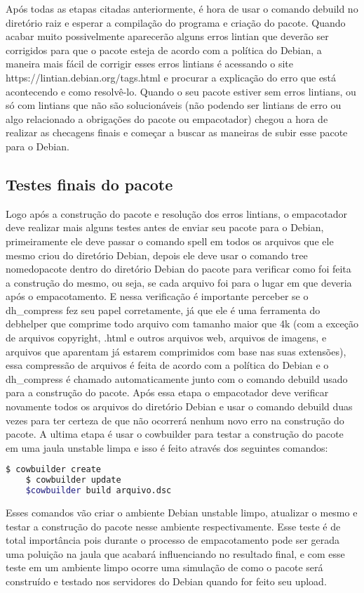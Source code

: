 Após todas as etapas citadas anteriormente, é hora de usar o comando debuild no diretório raiz e esperar a compilação do programa e criação do pacote. Quando acabar muito possivelmente aparecerão alguns erros lintian que deverão ser corrigidos para que o pacote esteja de acordo com a política do Debian, a maneira mais fácil de corrigir esses erros lintians é acessando o site https://lintian.debian.org/tags.html e procurar a explicação do erro que está acontecendo e como resolvê-lo. Quando o seu pacote estiver sem erros lintians, ou só com lintians que não são solucionáveis (não podendo ser lintians de erro ou algo relacionado a obrigações do pacote ou empacotador) chegou a hora de realizar as checagens finais e começar a buscar as maneiras de subir esse pacote para o Debian.

\subsection{Testes finais do pacote}

Logo após a construção do pacote e resolução dos erros lintians, o empacotador deve realizar mais alguns testes antes de enviar seu pacote para o Debian, primeiramente ele deve passar o comando spell em todos os arquivos que ele mesmo criou do diretório Debian, depois ele deve usar o comando tree nomedopacote dentro do diretório Debian do pacote para verificar como foi feita a construção do mesmo, ou seja, se cada arquivo foi para o lugar em que deveria após o empacotamento. E nessa verificação é importante perceber se o dh\_compress fez seu papel corretamente, já que ele é uma ferramenta do debhelper que comprime todo arquivo com tamanho maior que 4k (com a exceção de arquivos copyright, .html e outros arquivos web, arquivos de imagens, e arquivos que aparentam já estarem comprimidos com base nas suas extensões), essa compressão de arquivos é feita de acordo com a política do Debian e o dh\_compress é chamado automaticamente junto com o comando debuild usado para a construção do pacote. Após essa etapa o empacotador deve verificar novamente todos os arquivos do diretório Debian e usar o comando debuild duas vezes para ter certeza de que não ocorrerá nenhum novo erro na construção do pacote. A ultima etapa é usar o cowbuilder para testar a construção do pacote em uma jaula unstable limpa e isso é feito através dos seguintes comandos:

\begin{lstlisting}[language=bash]
	$ cowbuilder create
	$ cowbuilder update
	$cowbuilder build arquivo.dsc
\end{lstlisting} 

Esses comandos vão criar o ambiente Debian unstable limpo, atualizar o mesmo e testar a construção do pacote nesse ambiente respectivamente. Esse teste é de total importância pois durante o processo de empacotamento pode ser gerada uma poluição na jaula que acabará influenciando no resultado final, e com esse teste em um ambiente limpo ocorre uma simulação de como o pacote será construído e testado nos servidores do Debian quando for feito seu upload.